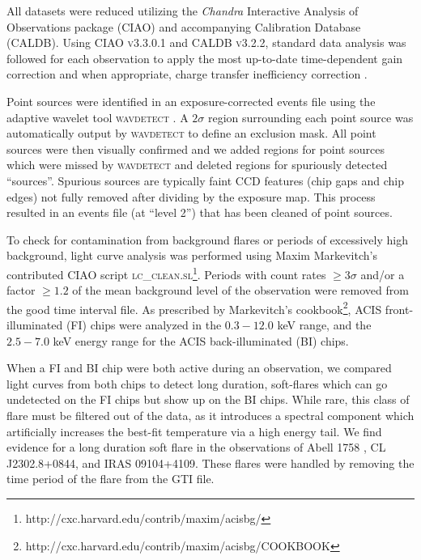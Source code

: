 \documentclass[apj]{emulateapj}
\begin{document}
All datasets were reduced utilizing the {\it Chandra} Interactive
Analysis of Observations package ({\textsc{CIAO}}) and accompanying
Calibration Database ({\textsc{CALDB}}). Using {\textsc{CIAO
v3.3.0.1}} and {\textsc{CALDB v3.2.2}}, standard data analysis was
followed for each observation to apply the most up-to-date
time-dependent gain correction and when appropriate, charge transfer
inefficiency correction \citep{2000ApJ...534L.139T}.

Point sources were identified in an exposure-corrected events file
using the adaptive wavelet tool {\textsc{wavdetect}}
\citep{2002ApJS..138..185F}. A $2\sigma$ region surrounding each point
source was automatically output by {\textsc{wavdetect}} to define an
exclusion mask.  All point sources were then visually confirmed and we
added regions for point sources which were missed by
{\textsc{wavdetect}} and deleted regions for spuriously detected
``sources''. Spurious sources are typically faint CCD features (chip
gaps and chip edges) not fully removed after dividing by the exposure
map. This process resulted in an events file (at ``level 2'') that has
been cleaned of point sources.

To check for contamination from background flares or periods of
excessively high background, light curve analysis was performed using
Maxim Markevitch's contributed {\textsc{CIAO}} script
{\textsc{lc\_clean.sl}}\footnote{http://cxc.harvard.edu/contrib/maxim/acisbg/}.
Periods with count rates $\geq 3\sigma$ and/or a factor $\geq 1.2$ of
the mean background level of the observation were removed from the
good time interval file. As prescribed by Markevitch's
cookbook\footnote{http://cxc.harvard.edu/contrib/maxim/acisbg/COOKBOOK},
ACIS front-illuminated (FI) chips were analyzed in the $0.3-12.0$ keV
range, and the $2.5-7.0$ keV energy range for the ACIS
back-illuminated (BI) chips.

When a FI and BI chip were both active during an observation, we
compared light curves from both chips to detect long duration,
soft-flares which can go undetected on the FI chips but show up on the
BI chips. While rare, this class of flare must be filtered out of the
data, as it introduces a spectral component which artificially
increases the best-fit temperature via a high energy tail. We find
evidence for a long duration soft flare in the observations of Abell
1758 \citep{2004ApJ...613..831D}, CL J2302.8+0844, and IRAS
09104+4109. These flares were handled by removing the time period of
the flare from the GTI file.
\end{document}
